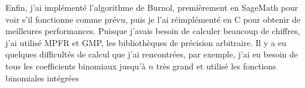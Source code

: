 Enfin, j'ai impl\'ement\'e l'algorithme de Burnol, premi\`erement en SageMath
pour voir s'il fonctionne comme pr\'evu, puis je l'ai r\'eimpl\'ement\'e en C
pour obtenir de meilleures performances. Puisque j'avais besoin de calculer
beaucoup de chiffres, j'ai utilis\'e MPFR et GMP, les biblioth\`eques de
pr\'ecision arbitraire. Il y a eu quelques difficult\'es de calcul que j'ai
rencontr\'ees, par exemple, j'ai eu besoin de tous les coefficients binomiaux
jusqu'\`a $n$ tr\`es grand et utilis\'e les fonctions binomiales int\'egr\'ees
